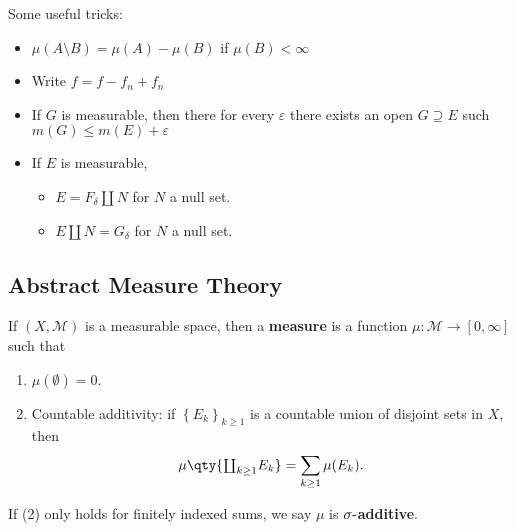 \begin{fact}

Some useful tricks:

\begin{itemize}
\tightlist
\item
  \(\mu(A\setminus B) = \mu(A) - \mu(B)\) if \(\mu(B) < \infty\)
\item
  Write \(f = f-f_n + f_n\)
\item
  If \(G\) is measurable, then there for every \({\varepsilon}\) there
  exists an open \(G \supseteq E\) such
  \(m(G) \leq m(E) + {\varepsilon}\)
\item
  If \(E\) is measurable,

  \begin{itemize}
  \tightlist
  \item
    \(E = F_{\delta} {\textstyle\coprod}N\) for \(N\) a null set.
  \item
    \(E {\textstyle\coprod}N = G_{\delta}\) for \(N\) a null set.
  \end{itemize}
\end{itemize}

\end{fact}

\hypertarget{abstract-measure-theory}{%
\subsection{Abstract Measure Theory}\label{abstract-measure-theory}}

\begin{definition}

If \((X, {\mathcal{M}})\) is a measurable space, then a \textbf{measure}
is a function \(\mu: {\mathcal{M}}\to [0,\infty]\) such that

\begin{enumerate}
\def\labelenumi{\arabic{enumi}.}
\tightlist
\item
  \(\mu(\emptyset) = 0\).
\item
  Countable additivity: if \(\left\{{E_k}\right\}_{k\geq 1}\) is a
  countable union of disjoint sets in \(X\), then
  \begin{align*}
  \mu\qty{{\textstyle\coprod}_{k\geq 1} E_k} = \sum_{k\geq 1} \mu(E_k)
  .\end{align*}
\end{enumerate}

If (2) only holds for finitely indexed sums, we say \(\mu\) is
\textbf{\(\sigma{\hbox{-}}\)additive}.

\end{definition}

